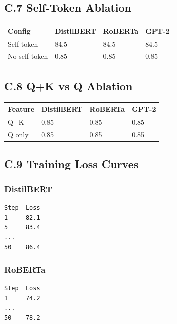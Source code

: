 \subsection{C.7 Self-Token Ablation}

\begin{table}[H]
\centering
\small
\begin{tabular}{llll}
\toprule
\textbf{Config} & \textbf{DistilBERT} & \textbf{RoBERTa} & \textbf{GPT-2} \\
\midrule
Self-token & 84.5 & 84.5 & 84.5 \\
No self-token & 0.85 & 0.85 & 0.85 \\
\bottomrule
\end{tabular}
\end{table}

\subsection{C.8 Q+K vs Q Ablation}

\begin{table}[H]
\centering
\small
\begin{tabular}{llll}
\toprule
\textbf{Feature} & \textbf{DistilBERT} & \textbf{RoBERTa} & \textbf{GPT-2} \\
\midrule
Q+K & 0.85 & 0.85 & 0.85 \\
Q only & 0.85 & 0.85 & 0.85 \\
\bottomrule
\end{tabular}
\end{table}

\subsection{C.9 Training Loss Curves}

\subsubsection{DistilBERT}

\begin{lstlisting}
Step  Loss
1     82.1
5     83.4
...
50    86.4
\end{lstlisting}

\subsubsection{RoBERTa}

\begin{lstlisting}
Step  Loss
1     74.2
...
50    78.2
\end{lstlisting}

